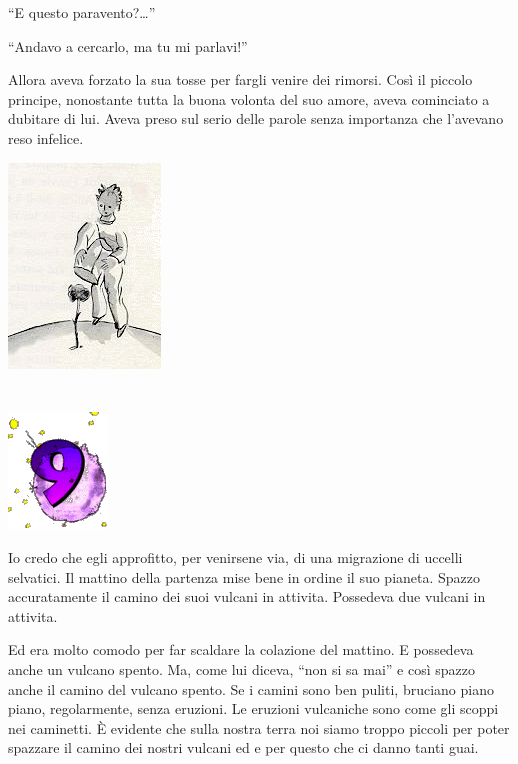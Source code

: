 \documentclass[11pt]{scrbook}
\begin{document}
``E questo paravento?\ldots{}''

``Andavo a cercarlo, ma tu mi parlavi!''

Allora aveva forzato la sua tosse per fargli venire dei rimorsi. Così il
piccolo principe, nonostante tutta la buona volonta del suo amore, aveva
cominciato a dubitare di lui. Aveva preso sul serio delle parole senza
importanza che l'avevano reso infelice.

\begin{center}
\includegraphics{./img/princKvetina.png}
\end{center}

\chapter{}
\begin{center}
\includegraphics{./img/chapter9.png}
\end{center}

Io credo che egli approfitto, per venirsene via, di una migrazione di
uccelli selvatici. Il mattino della partenza mise bene in ordine il suo
pianeta. Spazzo accuratamente il camino dei suoi vulcani in attivita.
Possedeva due vulcani in attivita.

Ed era molto comodo per far scaldare la colazione del mattino. E
possedeva anche un vulcano spento. Ma, come lui diceva, ``non si sa
mai'' e così spazzo anche il camino del vulcano spento. Se i camini sono
ben puliti, bruciano piano piano, regolarmente, senza eruzioni. Le
eruzioni vulcaniche sono come gli scoppi nei caminetti. È evidente che
sulla nostra terra noi siamo troppo piccoli per poter spazzare il camino
dei nostri vulcani ed e per questo che ci danno tanti guai.
\end{document}
